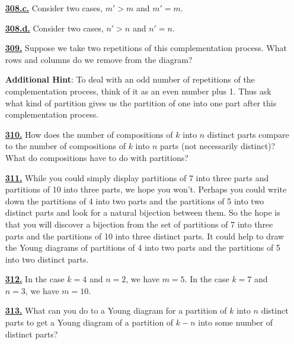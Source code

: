 \documentclass[10pt,]{book}
\theoremstyle{plain}
\theoremstyle{definition}
\theoremstyle{definition}
\theoremstyle{definition}
\numberwithin{equation}{chapter}
\newcommand{\gt}{>}
\begin{document}
\begin{itemize}[itemsep=1em]
\hypertarget{a-308.c}{}\item[\textbf{\hyperref[task-265]{308.c.}}]
\hypertarget{p-1522}{}%
Consider two cases, \(m' \gt m\) and \(m' = m\).%

\hypertarget{a-308.d}{}\item[\textbf{\hyperref[task-266]{308.d.}}]
\hypertarget{p-1525}{}%
Consider two cases, \(n' \gt n\) and \(n' = n\).%

\hypertarget{a-309}{}\item[\textbf{\hyperref[activity-302]{309.}}]
\hypertarget{p-1532}{}%
Suppose we take two repetitions of this complementation process. What rows and columns do we remove from the diagram?%

\par\smallskip
\noindent\textbf{Additional Hint}: \hypertarget{p-1533}{}%
To deal with an odd number of repetitions of the complementation process, think of it as an even number plus 1. Thus ask what kind of partition gives us the partition of one into one part after this complementation process.%

\hypertarget{a-310}{}\item[\textbf{\hyperref[activity-303]{310.}}]
\hypertarget{p-1540}{}%
How does the number of compositions of \(k\) into \(n\) distinct parts compare to the number of compositions of \(k\) into \(n\) parts (not necessarily distinct)? What do compositions have to do with partitions?%

\hypertarget{a-311}{}\item[\textbf{\hyperref[activity-304]{311.}}]
\hypertarget{p-1543}{}%
While you could simply display partitions of 7 into three parts and partitions of 10 into three parts, we hope you won't. Perhaps you could write down the partitions of 4 into two parts and the partitions of 5 into two distinct parts and look for a natural bijection between them. So the hope is that you will discover a bijection from the set of partitions of 7 into three parts and the partitions of 10 into three distinct parts. It could help to draw the Young diagrams of partitions of 4 into two parts and the partitions of 5 into two distinct parts.%

\hypertarget{a-312}{}\item[\textbf{\hyperref[activity-305]{312.}}]
\hypertarget{p-1546}{}%
In the case \(k=4\) and \(n=2\), we have \(m=5\). In the case \(k = 7\) and \(n = 3\), we have \(m = 10\).%

\hypertarget{a-313}{}\item[\textbf{\hyperref[activity-306]{313.}}]
\hypertarget{p-1549}{}%
What can you do to a Young diagram for a partition of \(k\) into \(n\) distinct parts to get a Young diagram of a partition of \(k-n\) into some number of distinct parts?%


\end{itemize}
\end{document}
